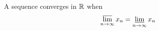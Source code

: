 \begin{theorem}
    A sequence converges in $\mathbb{R}$ when 
    \begin{equation}
        \varlimsup_{n\rightarrow \infty} x_n = \varliminf_{n\rightarrow \infty} x_n
    \end{equation}
\end{theorem}










































































































